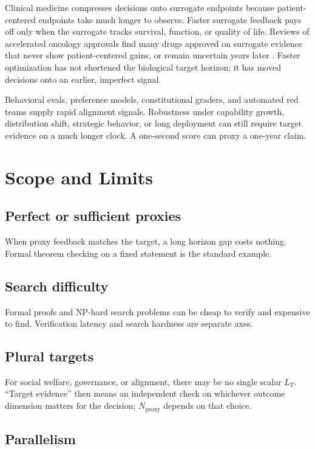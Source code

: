 \documentclass[11pt]{article}
\newcommand{\Nproxy}{N_{\mathrm{proxy}}}
\begin{document}
Clinical medicine compresses decisions onto surrogate endpoints because patient-centered endpoints take much longer to observe. Faster surrogate feedback pays off only when the surrogate tracks survival, function, or quality of life. Reviews of accelerated oncology approvals find many drugs approved on surrogate evidence that never show patient-centered gains, or remain uncertain years later \parencite{gyawali2019accelerated,liu2024clinicalbenefit}. Faster optimization has not shortened the biological target horizon; it has moved decisions onto an earlier, imperfect signal.

Behavioral evals, preference models, constitutional graders, and automated red teams supply rapid alignment signals. Robustness under capability growth, distribution shift, strategic behavior, or long deployment can still require target evidence on a much longer clock. A one-second score can proxy a one-year claim.

\section{Scope and Limits}

\subsection{Perfect or sufficient proxies}

When proxy feedback matches the target, a long horizon gap costs nothing. Formal theorem checking on a fixed statement is the standard example.

\subsection{Search difficulty}

Formal proofs and NP-hard search problems can be cheap to verify and expensive to find. Verification latency and search hardness are separate axes.

\subsection{Plural targets}

For social welfare, governance, or alignment, there may be no single scalar \(L_T\). ``Target evidence'' then means an independent check on whichever outcome dimension matters for the decision; \(\Nproxy\) depends on that choice.

\subsection{Parallelism}
\end{document}
